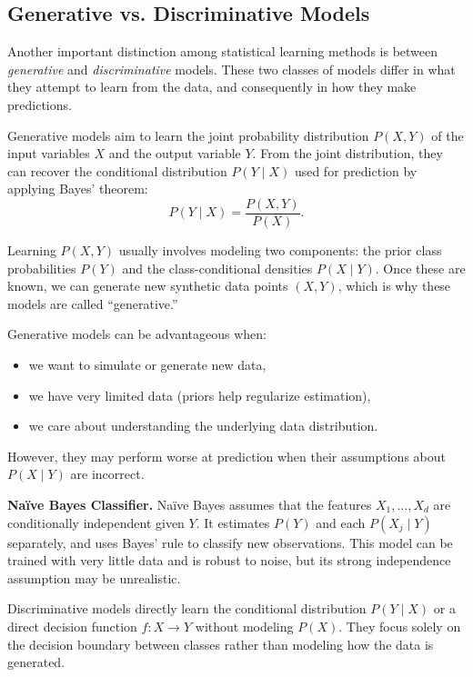 
\subsection{Generative vs. Discriminative Models}
\label{sec:generative_vs_discriminative}

Another important distinction among statistical learning methods is between \emph{generative} and \emph{discriminative} models. 
These two classes of models differ in what they attempt to learn from the data, and consequently in how they make predictions.

Generative models aim to learn the joint probability distribution $P(X,Y)$ of the input variables $X$ and the output variable $Y$. 
From the joint distribution, they can recover the conditional distribution $P(Y\mid X)$ used for prediction by applying Bayes’ theorem:
\[
P(Y\mid X) = \frac{P(X,Y)}{P(X)}.
\]

Learning $P(X,Y)$ usually involves modeling two components: the prior class probabilities $P(Y)$ and the class-conditional densities $P(X\mid Y)$. 
Once these are known, we can generate new synthetic data points $(X,Y)$, which is why these models are called “generative.”

Generative models can be advantageous when:
\begin{itemize}
    \item we want to simulate or generate new data,
    \item we have very limited data (priors help regularize estimation),
    \item we care about understanding the underlying data distribution.
\end{itemize}

However, they may perform worse at prediction when their assumptions about $P(X\mid Y)$ are incorrect.

\begin{example}
\textbf{Naïve Bayes Classifier.}  
Naïve Bayes assumes that the features $X_1,\dots,X_d$ are conditionally independent given $Y$. 
It estimates $P(Y)$ and each $P(X_j\mid Y)$ separately, and uses Bayes’ rule to classify new observations. 
This model can be trained with very little data and is robust to noise, but its strong independence assumption may be unrealistic.
\end{example}

Discriminative models directly learn the conditional distribution $P(Y\mid X)$ or a direct decision function $f\colon X\to Y$ without modeling $P(X)$. 
They focus solely on the decision boundary between classes rather than modeling how the data is generated.


